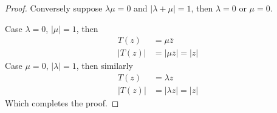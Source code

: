 \documentclass{article}
\theoremstyle{definition}
\numberwithin{lemma}{problem}
\numberwithin{equation}{problem}
\newcommand{\conj}[1]{\overline{#1}}
\newcommand{\abs}[1]{\left\lvert #1\right\rvert}
\begin{document}
\begin{proof}

    Conversely suppose $\lambda\mu = 0$ and $\abs{\lambda + \mu} = 1$,
    then $\lambda = 0$ or $\mu = 0$.

    Case $\lambda = 0$, $\abs\mu = 1$, then
    \begin{align*}
        T(z) &= \mu \conj{z} \\
        \abs{T(z)} &= \abs{\mu \conj{z}} = \abs{z}
    \end{align*}
    Case $\mu = 0$, $\abs\lambda = 1$, then similarly
    \begin{align*}
        T(z) &= \lambda z \\
        \abs{T(z)} &= \abs{\lambda z} = \abs{z}
    \end{align*}
    Which completes the proof.
\end{proof}
\end{document}
